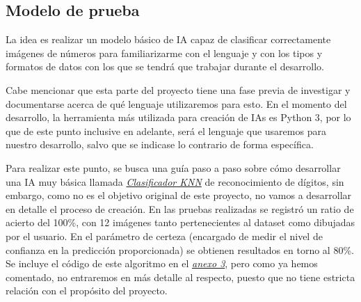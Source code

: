 \documentclass{article}
\begin{document}
\subsection{Modelo de prueba}

La idea es realizar un modelo básico de IA capaz de clasificar correctamente imágenes de números para familiarizarme con el lenguaje y con los tipos y formatos de datos con los que se tendrá que trabajar durante el desarrollo.

Cabe mencionar que esta parte del proyecto tiene una fase previa de investigar y documentarse acerca de qué lenguaje utilizaremos para esto. En el momento del desarrollo, la herramienta más utilizada para creación de IAs es Python 3, por lo que de este punto inclusive en adelante, será el lenguaje que usaremos para nuestro desarrollo, salvo que se indicase lo contrario de forma específica.
    
Para realizar este punto, se busca una guía paso a paso sobre cómo desarrollar una IA muy básica llamada \hyperref[sec:terms]{\textit{Clasificador KNN}\tec} de reconocimiento de dígitos, sin embargo, como no es el objetivo original de este proyecto, no vamos a desarrollar en detalle el proceso de creación.
En las pruebas realizadas se registró un ratio de acierto del 100\%, con 12 imágenes tanto pertenecientes al dataset como dibujadas por el usuario. En el parámetro de certeza (encargado de medir el nivel de confianza en la predicción proporcionada) se obtienen resultados en torno al 80\%. Se incluye el código de este algoritmo en el \hyperref[sec:terms]{\textit{anexo 3}}, pero como ya hemos comentado, no entraremos en más detalle al respecto, puesto que no tiene estricta relación con el propósito del proyecto.
\end{document}
